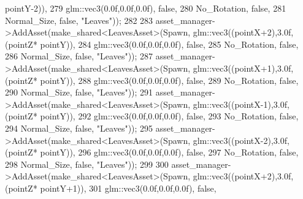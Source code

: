 \begin{DoxyCode}
      pointY-2)),
279                                                              glm::vec3(0.0f,0.0f,0.0f), \textcolor{keyword}{false},
280                                                              No\_Rotation, \textcolor{keyword}{false},
281                                                              Normal\_Size, \textcolor{keyword}{false}, \textcolor{stringliteral}{"Leaves"}));
282 
283             asset\_manager->AddAsset(make\_shared<LeavesAsset>(Spawn, glm::vec3((pointX+2),3.0f,(pointZ*
      pointY)),
284                                                              glm::vec3(0.0f,0.0f,0.0f), \textcolor{keyword}{false},
285                                                              No\_Rotation, \textcolor{keyword}{false},
286                                                              Normal\_Size, \textcolor{keyword}{false}, \textcolor{stringliteral}{"Leaves"}));
287             asset\_manager->AddAsset(make\_shared<LeavesAsset>(Spawn, glm::vec3((pointX+1),3.0f,(pointZ*
      pointY)),
288                                                              glm::vec3(0.0f,0.0f,0.0f), \textcolor{keyword}{false},
289                                                              No\_Rotation, \textcolor{keyword}{false},
290                                                              Normal\_Size, \textcolor{keyword}{false}, \textcolor{stringliteral}{"Leaves"}));
291             asset\_manager->AddAsset(make\_shared<LeavesAsset>(Spawn, glm::vec3((pointX-1),3.0f,(pointZ*
      pointY)),
292                                                              glm::vec3(0.0f,0.0f,0.0f), \textcolor{keyword}{false},
293                                                              No\_Rotation, \textcolor{keyword}{false},
294                                                              Normal\_Size, \textcolor{keyword}{false}, \textcolor{stringliteral}{"Leaves"}));
295             asset\_manager->AddAsset(make\_shared<LeavesAsset>(Spawn, glm::vec3((pointX-2),3.0f,(pointZ*
      pointY)),
296                                                              glm::vec3(0.0f,0.0f,0.0f), \textcolor{keyword}{false},
297                                                              No\_Rotation, \textcolor{keyword}{false},
298                                                              Normal\_Size, \textcolor{keyword}{false}, \textcolor{stringliteral}{"Leaves"})); 
299 
300             asset\_manager->AddAsset(make\_shared<LeavesAsset>(Spawn, glm::vec3((pointX+2),3.0f,(pointZ*
      pointY+1)),
301                                                              glm::vec3(0.0f,0.0f,0.0f), \textcolor{keyword}{false},

\end{DoxyCode}
